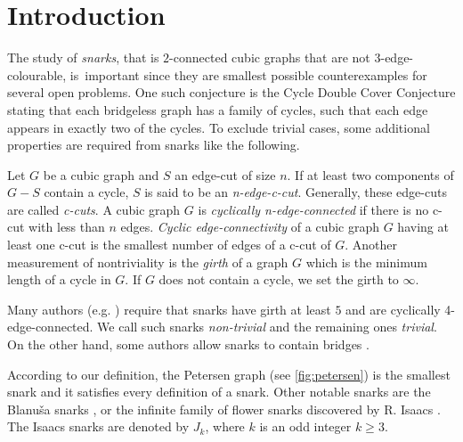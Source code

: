 \section{Introduction}


The study of \textit{snarks}, that is $2$-connected cubic graphs that are not 3-edge-colourable, is~important since they are smallest possible counterexamples for several open problems.
One such conjecture is the Cycle Double Cover Conjecture stating that each bridgeless graph has a family of cycles, such that each edge appears in exactly two of the cycles.
To exclude trivial cases, some additional properties are required from snarks like the following.

Let $G$ be a cubic graph and $S$ an edge-cut of size $n$. If at least two components of $G - S$ contain a cycle, $S$ is said to be an \textit{n-edge-c-cut}. Generally, these edge-cuts are called \textit{c-cuts}. 
A cubic graph $G$ is \textit{cyclically n-edge-connected} if there is no c-cut with less than $n$ edges. \textit{Cyclic edge-connectivity} of a cubic graph $G$ having at least one c-cut is the smallest number of edges of a c-cut of $G$.
Another measurement of nontriviality is the \textit{girth} of a graph $G$ which is the minimum length of a cycle in $G$. If $G$ does not contain a cycle, we set the girth to $\infty$.

Many authors (e.g. \cite{Preissmann1983, Nedela1996}) require that snarks have girth at least $5$ and are cyclically 4-edge-connected. We call such snarks \emph{non-trivial} and the remaining ones \emph{trivial}. On the other hand, some authors allow snarks to contain bridges \cite{IrreducibleSnarksSkoviera}. 

%	

According to our definition, the Petersen graph (see \cref{fig:petersen}) is the smallest snark and it satisfies every definition of a snark. Other notable snarks are the Blanuša snarks \cite{Blanusa}, or the infinite family of flower snarks discovered by R. Isaacs \cite{Isaacs1975}. The Isaacs snarks are denoted by $J_k$, where $k$ is an odd integer $k\geq 3$.

